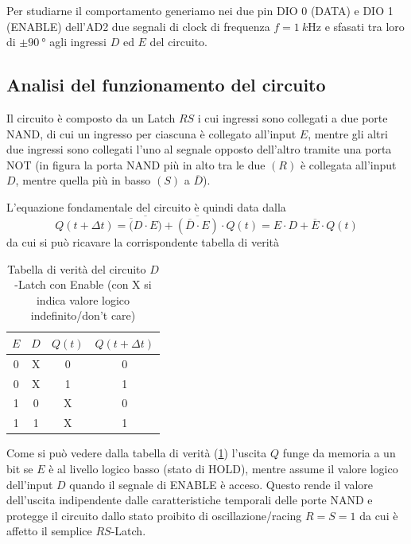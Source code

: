\documentclass[10pt, a4paper, italian]{article}
\begin{document}
Per studiarne il comportamento generiamo nei due pin DIO 0 (DATA) e DIO 1
(ENABLE) dell'AD2 due segnali di clock di frequenza $f = \SI{1}{k\hertz}$ e
sfasati tra loro di $\pm \SI{90}{\degree}$ agli ingressi $D$ ed $E$ del
circuito. 

\subsection{Analisi del funzionamento del circuito}
Il circuito è composto da un Latch $RS$ i cui ingressi sono collegati a due
porte NAND, di cui un ingresso per ciascuna è collegato all'input $E$, mentre
gli altri due ingressi sono collegati l'uno al segnale opposto dell'altro
tramite una porta NOT (in figura la porta NAND più in alto tra le due $(R)$ è
collegata all'input $D$, mentre quella più in basso $(S)$ a $\overline{D}$).

L'equazione fondamentale del circuito è quindi data dalla
\begin{equation}
Q(t + \Delta t) = \overline{\overline(D \cdot E)} +
\overline{(\overline{D} \cdot E)} \cdot Q(t) =
E \cdot D + \overline{E} \cdot Q(t)
\end{equation}
da cui si può ricavare la corrispondente tabella di verità
\begin{table}
\begin{center}
    \begin{tabular}{cccc}
      \toprule
      $E$ & $D$     & $Q(t)$  & $ Q(t + \Delta t)$ \\
      \midrule
      \midrule
      0     & X & 0         & 0 \\
      0     & X & 1         & 1 \\
      1     & 0         & X & 0 \\
      1     & 1         & X & 1 \\
      \bottomrule
    \end{tabular}
\end{center}
\caption{Tabella di verità del circuito $D$-Latch con Enable (con X si indica
valore logico indefinito/don't care) \label{tab: dlatch}}
\end{table}

Come si può vedere dalla tabella di verità (\cref{tab: dlatch}) l'uscita $Q$
funge da memoria a un bit se $E$ è al livello logico basso (stato di HOLD),
mentre assume il valore logico dell'input $D$ quando il segnale di ENABLE è
acceso.
Questo rende il valore dell'uscita indipendente dalle caratteristiche
temporali delle porte NAND e protegge il circuito dallo stato proibito di
oscillazione/racing $R = S = 1$ da cui è affetto il semplice $RS$-Latch.
\end{document}
